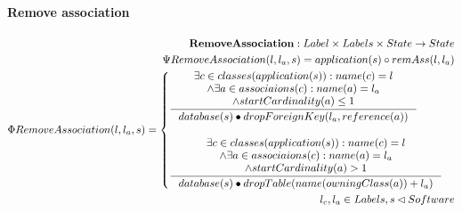 \documentclass[11pt]{article}
\begin{document}
\paragraph{Remove association} 
\begin{align*}
    \mathbf{RemoveAssociation} : Label \times Labels \times State \rightarrow State \\ 
    \Psi RemoveAssociation(l, l_a, s) = application(s) \circ remAss(l, l_a) \\
    \Phi RemoveAssociation(l, l_a, s) = \begin{cases}
     	\inference{\exists c \in classes(application(s)) : name(c) = l \\
     	\wedge \exists a \in associaions(c) : name(a) = l_a  \\
     	\wedge startCardinality(a) \leq 1 \\}{database(s) \bullet dropForeignKey(l_a, reference(a))} \\\\
     	\inference{\exists c \in classes(application(s)) : name(c) = l \\
     	\wedge \exists a \in associaions(c) : name(a) = l_a  \\
     	\wedge startCardinality(a) > 1}{database(s) \bullet dropTable(name(owningClass(a))+l_a)} 
     \end{cases}\\
    l_c, l_a \in Labels, s \lhd Software
\end{align*}
\end{document}
